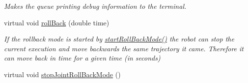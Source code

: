 \begin{DoxyCompactItemize}
\begin{DoxyCompactList}\small\item\em Makes the queue printing debug information to the terminal. \end{DoxyCompactList}\item 
virtual void \hyperlink{classkukadu_1_1ControlQueue_a650c486b9f78d3dec1db8741b575a0ab}{roll\-Back} (double time)
\begin{DoxyCompactList}\small\item\em If the rollback mode is started by \hyperlink{classkukadu_1_1ControlQueue_acb6ba5c61e9c26dcaa8e4073946e3791}{start\-Roll\-Back\-Mode()} the robot can stop the current execution and move backwards the same trajectory it came. Therefore it can move back in time for a given time (in seconds) \end{DoxyCompactList}\item 
\hypertarget{classkukadu_1_1ControlQueue_a38ba0b9fffb0fff6d39d742b1a2eb76b}{virtual void \hyperlink{classkukadu_1_1ControlQueue_a38ba0b9fffb0fff6d39d742b1a2eb76b}{stop\-Joint\-Roll\-Back\-Mode} ()}\label{classkukadu_1_1ControlQueue_a38ba0b9fffb0fff6d39d742b1a2eb76b}


\end{DoxyCompactItemize}
